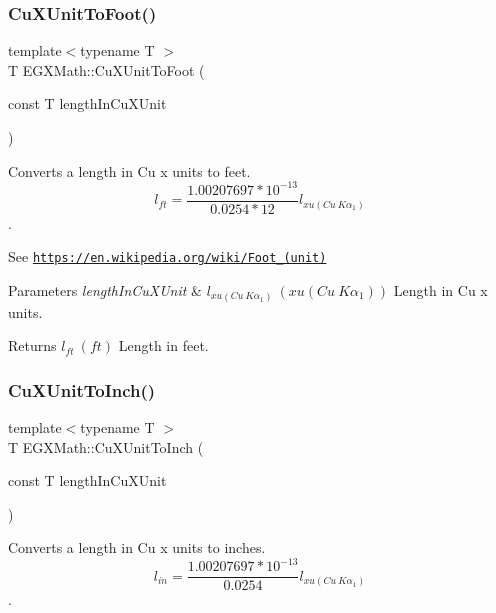 \subsubsection{\texorpdfstring{Cu\+X\+Unit\+To\+Foot()}{CuXUnitToFoot()}}
{\footnotesize\ttfamily template$<$typename T $>$ \\
T E\+G\+X\+Math\+::\+Cu\+X\+Unit\+To\+Foot (\begin{DoxyParamCaption}\item[{const T}]{length\+In\+Cu\+X\+Unit }\end{DoxyParamCaption})}



Converts a length in Cu x units to feet. \[ l_{ft}= \frac{1.00207697*10^{-13}}{0.0254 * 12} l_{xu(Cu\ K\alpha_1)} \]. 

See \href{https://en.wikipedia.org/wiki/Foot_(unit)}{\tt https\+://en.\+wikipedia.\+org/wiki/\+Foot\+\_\+(unit)} 
\begin{DoxyParams}{Parameters}
{\em length\+In\+Cu\+X\+Unit} & $ l_{xu(Cu\ K\alpha_1)}\ (xu(Cu\ K\alpha_1))$ Length in Cu x units. \\
\hline
\end{DoxyParams}
\begin{DoxyReturn}{Returns}
$ l_{ft}\ (ft)$ Length in feet. 
\end{DoxyReturn}
\mbox{\label{group___e_g_x_math-_conversions-_length_conversions-_non-_s_i-_cu_x_unit-_imperial_ga7b5e4603f02f1aefa96487f4a19b2930}} 
\subsubsection{\texorpdfstring{Cu\+X\+Unit\+To\+Inch()}{CuXUnitToInch()}}
{\footnotesize\ttfamily template$<$typename T $>$ \\
T E\+G\+X\+Math\+::\+Cu\+X\+Unit\+To\+Inch (\begin{DoxyParamCaption}\item[{const T}]{length\+In\+Cu\+X\+Unit }\end{DoxyParamCaption})}



Converts a length in Cu x units to inches. \[ l_{in}= \frac{1.00207697*10^{-13}}{0.0254} l_{xu(Cu\ K\alpha_1)} \]. 

